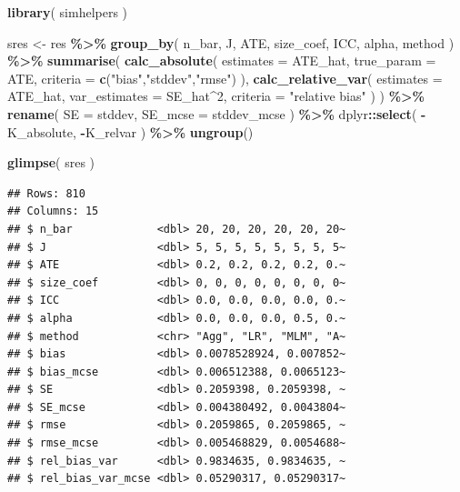 \documentclass[
]{book}
\newenvironment{Shaded}{\begin{snugshade}}{\end{snugshade}}
\newcommand{\AttributeTok}[1]{\textcolor[rgb]{0.13,0.29,0.53}{#1}}
\newcommand{\DecValTok}[1]{\textcolor[rgb]{0.00,0.00,0.81}{#1}}
\newcommand{\FunctionTok}[1]{\textcolor[rgb]{0.13,0.29,0.53}{\textbf{#1}}}
\newcommand{\NormalTok}[1]{#1}
\newcommand{\OtherTok}[1]{\textcolor[rgb]{0.56,0.35,0.01}{#1}}
\newcommand{\SpecialCharTok}[1]{\textcolor[rgb]{0.81,0.36,0.00}{\textbf{#1}}}
\newcommand{\StringTok}[1]{\textcolor[rgb]{0.31,0.60,0.02}{#1}}
\begin{document}
\begin{Shaded}
\begin{Highlighting}[]
\FunctionTok{library}\NormalTok{( simhelpers )}

\NormalTok{sres }\OtherTok{\textless{}{-}} 
\NormalTok{  res }\SpecialCharTok{\%\textgreater{}\%} 
  \FunctionTok{group\_by}\NormalTok{( n\_bar, J, ATE, size\_coef, ICC, alpha, method ) }\SpecialCharTok{\%\textgreater{}\%}
  \FunctionTok{summarise}\NormalTok{( }
    \FunctionTok{calc\_absolute}\NormalTok{( }
      \AttributeTok{estimates =}\NormalTok{ ATE\_hat, }\AttributeTok{true\_param =}\NormalTok{ ATE, }
      \AttributeTok{criteria =} \FunctionTok{c}\NormalTok{(}\StringTok{"bias"}\NormalTok{,}\StringTok{"stddev"}\NormalTok{,}\StringTok{"rmse"}\NormalTok{)}
\NormalTok{    ),}
    \FunctionTok{calc\_relative\_var}\NormalTok{( }
      \AttributeTok{estimates =}\NormalTok{ ATE\_hat, }\AttributeTok{var\_estimates =}\NormalTok{ SE\_hat}\SpecialCharTok{\^{}}\DecValTok{2}\NormalTok{,}
      \AttributeTok{criteria =} \StringTok{"relative bias"}
\NormalTok{    ) }
\NormalTok{  ) }\SpecialCharTok{\%\textgreater{}\%}
  \FunctionTok{rename}\NormalTok{( }\AttributeTok{SE =}\NormalTok{ stddev, }\AttributeTok{SE\_mcse =}\NormalTok{ stddev\_mcse ) }\SpecialCharTok{\%\textgreater{}\%}
\NormalTok{  dplyr}\SpecialCharTok{::}\FunctionTok{select}\NormalTok{( }\SpecialCharTok{{-}}\NormalTok{K\_absolute, }\SpecialCharTok{{-}}\NormalTok{K\_relvar ) }\SpecialCharTok{\%\textgreater{}\%}
  \FunctionTok{ungroup}\NormalTok{()}

\FunctionTok{glimpse}\NormalTok{( sres )}
\end{Highlighting}
\end{Shaded}

\begin{verbatim}
## Rows: 810
## Columns: 15
## $ n_bar             <dbl> 20, 20, 20, 20, 20, 20~
## $ J                 <dbl> 5, 5, 5, 5, 5, 5, 5, 5~
## $ ATE               <dbl> 0.2, 0.2, 0.2, 0.2, 0.~
## $ size_coef         <dbl> 0, 0, 0, 0, 0, 0, 0, 0~
## $ ICC               <dbl> 0.0, 0.0, 0.0, 0.0, 0.~
## $ alpha             <dbl> 0.0, 0.0, 0.0, 0.5, 0.~
## $ method            <chr> "Agg", "LR", "MLM", "A~
## $ bias              <dbl> 0.0078528924, 0.007852~
## $ bias_mcse         <dbl> 0.006512388, 0.0065123~
## $ SE                <dbl> 0.2059398, 0.2059398, ~
## $ SE_mcse           <dbl> 0.004380492, 0.0043804~
## $ rmse              <dbl> 0.2059865, 0.2059865, ~
## $ rmse_mcse         <dbl> 0.005468829, 0.0054688~
## $ rel_bias_var      <dbl> 0.9834635, 0.9834635, ~
## $ rel_bias_var_mcse <dbl> 0.05290317, 0.05290317~
\end{verbatim}
\end{document}
